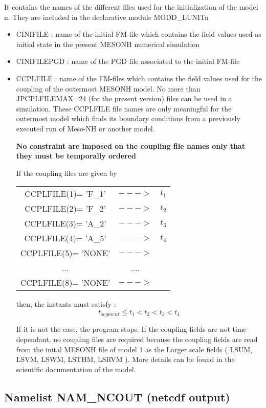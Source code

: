 It contains the names  of the different files used for the initialization of
 the model n. They are
included in the declarative module MODD\_LUNITn
\begin{itemize}
\item
{}
CINIFILE : name of the initial FM-file which contains the field values
  used as initial state in the present MESONH numerical simulation
\item
{}
CINIFILEPGD : name of the PGD file  associated to the initial FM-file
\item
{}
CCPLFILE : name of the FM-files which contains the field values used for the
coupling of the outermost MESONH model. No more than JPCPLFILEMAX=24 (for the
present version) files can be
used in a simulation. These CCPLFILE file names are only meaningful for the
outermost model which finds its boundary conditions from a previously executed 
run of Meso-NH or another model.

 {\bf No constraint are imposed on the coupling file names only that they must
be temporally ordered }

If the coupling files are given  by

\begin{tabular}{ccc}
CCPLFILE(1)= 'F\_1' & $--->$ & $t_1$ \\
CCPLFILE(2)= 'F\_2'  & $--->$ & $t_2$ \\
CCPLFILE(3)= 'A\_2'  & $--->$ & $t_3$ \\
CCPLFILE(4)= 'A\_5'  & $--->$ & $t_4$ \\
CCPLFILE(5)= 'NONE' & $--->$ &  \\
...                 & .... &  \\
CCPLFILE(8)= 'NONE' & $--->$ &  
\end{tabular} 

then, the instants must satisfy :
$$ t_{segment} \leq t_1 < t_2  < t_3  < t_4  $$

If it is not the case, the program stops. If the coupling fields are 
not time dependant, no coupling files are required because the coupling fields 
are read from the inital MESONH file of model 1 as the Larger
scale fields ( LSUM, LSVM, LSWM, LSTHM, LSRVM ). More details can be found in
the scientific documentation of the model.
\end{itemize}
\subsection{Namelist NAM\_NCOUT (netcdf output)\label{s:namncout}}

